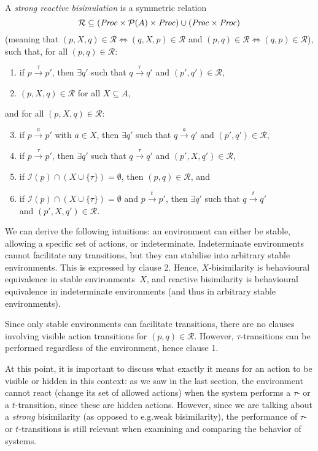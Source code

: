\begin{isabellebody}
\begin{isamarkuptext}
A \emph{strong reactive bisimulation} is a symmetric relation 
$$\mathcal{R} \subseteq (\mathit{Proc} \times \mathcal{P}(A) \times \mathit{Proc}) \cup (\mathit{Proc} \times \mathit{Proc})$$
(meaning that $(p,X,q)\!\in\!\mathcal{R}\!\iff\!(q,X,p)\!\in\!\mathcal{R}$ and
$(p,q)\!\in\!\mathcal{R}\!\iff\!(q,p)\!\in\!\mathcal{R}$),\\
such that,
\newpage
for all $(p,q) \in \mathcal{R}$:
\begin{enumerate}
    \item if $p \xrightarrow{\tau} p'$, then $\exists q'$ such that $q \xrightarrow{\tau} q'$ and $(p',q') \in \mathcal{R}$,
    \item $(p,X,q) \in \mathcal{R}$ for all $X \subseteq A$,
\end{enumerate}
and for all $(p,X,q) \in \mathcal{R}$:
\begin{enumerate}
    \setcounter{enumi}{2}
    \item if $p \xrightarrow{a} p'$ with $a \in X$, then $\exists q'$ such that $q \xrightarrow{a} q'$ and $(p',q') \in \mathcal{R}$,
    \item if $p \xrightarrow{\tau} p'$, then $\exists q'$ such that $q \xrightarrow{\tau} q'$ and $(p',X,q') \in \mathcal{R}$,
    \item if $\mathcal{I}(p) \cap (X \cup \{\tau\}) = \emptyset$, then $(p,q) \in \mathcal{R}$, and
    \item if $\mathcal{I}(p) \cap (X \cup \{\tau\}) = \emptyset$ and $p \xrightarrow{t} p'$, then $\exists q'$ such that $q \xrightarrow{t} q'$\\and $(p',X,q') \in \mathcal{R}$.
\end{enumerate}

We can derive the following intuitions: an environment can either be stable, allowing a specific set of actions, or indeterminate. Indeterminate environments cannot facilitate any transitions, but they can stabilise into arbitrary stable environments. This is expressed by clause 2. Hence, $X$-bisimilarity is behavioural equivalence in stable environments~$X$, and reactive bisimilarity is behavioural equivalence in indeterminate environments (and thus in arbitrary stable environments).

Since only stable environments can facilitate transitions, there are no clauses involving visible action transitions for $(p,q) \in \mathcal{R}$. However, $\tau$-transitions can be performed regardless of the environment, hence clause 1.

At this point, it is important to discuss what exactly it means for an action to be visible or hidden in this context: as we saw in the last section, the environment cannot react (change its set of allowed actions) when the system performs a $\tau$- or a $t$-transition, since these are hidden actions. However, since we are talking about a \emph{strong} bisimilarity (as opposed to e.g.\@ weak bisimilarity), the performance of $\tau$- or $t$-transitions is still relevant when examining and comparing the behavior of systems.


\end{isamarkuptext}
\end{isabellebody}
